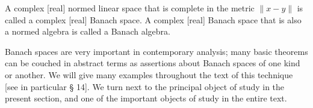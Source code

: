 A complex [real] normed linear space that is complete in the metric $\|x - y\|$ is called a complex [real] Banach space. A complex [real] Banach space that is also a normed algebra is called a Banach algebra.

Banach spaces are very important in contemporary analysis; many basic theorems can be couched in abstract terms as assertions about Banach spaces of one kind or another. We will give many examples throughout the text of this technique [see in particular § 14]. We turn next to the principal object of study in the present section, and one of the important objects of study in the entire text.